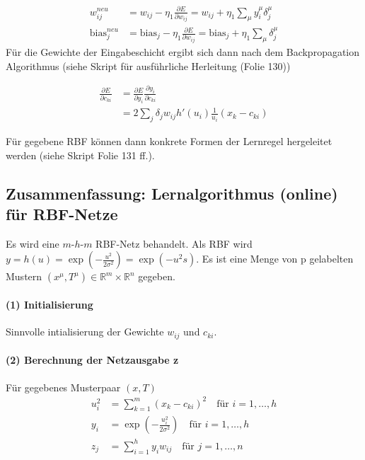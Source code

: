 \begin{align*}
    w_{ij}^{neu} &= w_{ij} - \eta_1 \frac{\partial E}{\partial w_{ij}} = w_{ij} + \eta_1 \sum_\mu y_i^\mu\delta_j^\mu\\
    \text{bias}_j^{neu} &= \text{bias}_j - \eta_1 \frac{\partial E}{\partial w_{ij}}=\text{bias}_j +\eta_1\sum_\mu\delta_j^\mu
\end{align*}
Für die Gewichte der Eingabeschicht ergibt sich dann nach dem Backpropagation Algorithmus (siehe Skript für ausführliche Herleitung (Folie 130))

\begin{align*}
    \frac{\partial E}{\partial c_{ki}} &= \frac{\partial E}{\partial y_i}\frac{\partial y_i}{\partial c_{ki}}\\
    &= 2\sum_j\delta_jw_{ij}h'(u_i)\frac{1}{u_i}(x_k-c_{ki})
\end{align*}

Für gegebene RBF können dann konkrete Formen der Lernregel hergeleitet werden (siehe Skript Folie 131 ff.).

\subsection{Zusammenfassung: Lernalgorithmus (online) für RBF-Netze}
Es wird eine $m$-$h$-$m$ RBF-Netz behandelt. Als RBF wird $y=h(u) = \exp{(-\frac{u^2}{2\sigma^2})} = \exp{(-u^2s)}$. Es ist eine Menge von p gelabelten Mustern $(x^\mu,T^\mu)\in\mathbb{R}^m \times \mathbb{R}^n$ gegeben.\\

\paragraph{(1) Initialisierung}
Sinnvolle intialisierung der Gewichte $w_{ij}$ und $c_{ki}$.

\paragraph{(2) Berechnung der Netzausgabe z}
Für gegebenes Musterpaar $(x,T)$\\
\begin{align*}
    u_i^2 &= \sum_{k=1}^m(x_k-c_{ki})^2 \quad \text{für } i=1,\dots,h\\
    y_i &= \exp{(-\frac{u_i^2}{2\sigma^2})} \quad \text{für } i=1,\dots,h\\
    z_j &= \sum_{i=1}^hy_iw_{ij} \quad \text{für } j=1,\dots,n
\end{align*}

